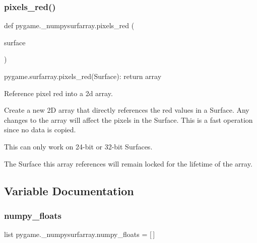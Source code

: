 \subsubsection{\texorpdfstring{pixels\+\_\+red()}{pixels\_red()}}
{\footnotesize\ttfamily def pygame.\+\_\+numpysurfarray.\+pixels\+\_\+red (\begin{DoxyParamCaption}\item[{}]{surface }\end{DoxyParamCaption})}

\begin{DoxyVerb}pygame.surfarray.pixels_red(Surface): return array

Reference pixel red into a 2d array.

Create a new 2D array that directly references the red values
in a Surface. Any changes to the array will affect the pixels
in the Surface. This is a fast operation since no data is copied.

This can only work on 24-bit or 32-bit Surfaces.

The Surface this array references will remain locked for the
lifetime of the array.
\end{DoxyVerb}
 

\subsection{Variable Documentation}
\mbox{\label{namespacepygame_1_1__numpysurfarray_a819bcca31525ef44e1b922e381542c7e}} 
\subsubsection{\texorpdfstring{numpy\+\_\+floats}{numpy\_floats}}
{\footnotesize\ttfamily list pygame.\+\_\+numpysurfarray.\+numpy\+\_\+floats = \mbox{[}$\,$\mbox{]}}

